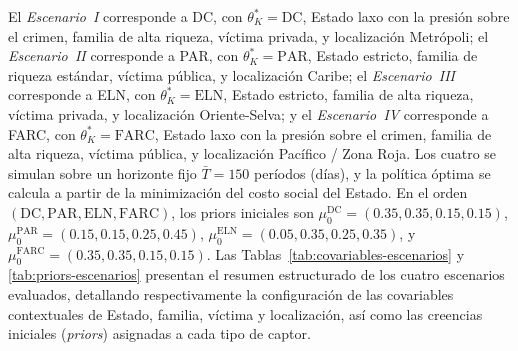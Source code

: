 \documentclass[review,authoryear,12pt]{elsarticle}
\theoremstyle{plain}
\theoremstyle{definition}
\newcommand{\1}{\mathbf{1}}
\begin{document}
El \emph{Escenario~I} corresponde a DC, con $\theta_K^\ast=\mathrm{DC}$, Estado laxo con la presión sobre el crimen, familia de alta riqueza, víctima privada, y localización Metrópoli; el \emph{Escenario~II} corresponde a PAR, con $\theta_K^\ast=\mathrm{PAR}$, Estado estricto, familia de riqueza estándar, víctima pública, y localización Caribe; el \emph{Escenario~III} corresponde a ELN, con $\theta_K^\ast=\mathrm{ELN}$, Estado estricto, familia de alta riqueza, víctima privada, y localización Oriente-Selva; y el \emph{Escenario~IV} corresponde a FARC, con $\theta_K^\ast=\mathrm{FARC}$, Estado laxo con la presión sobre el crimen, familia de alta riqueza, víctima pública, y localización Pacífico / Zona Roja. Los cuatro se simulan sobre un horizonte fijo $\bar{T}=150$ períodos (días), y la política óptima se calcula a partir de la minimización del costo social del Estado. En el orden $(\mathrm{DC},\mathrm{PAR},\mathrm{ELN},\mathrm{FARC})$, los priors iniciales son $\mu_0^{\mathrm{DC}}=(0.35,0.35,0.15,0.15)$, $\mu_0^{\mathrm{PAR}}=(0.15,0.15,0.25,0.45)$, $\mu_0^{\mathrm{ELN}}=(0.05,0.35,0.25,0.35)$, y $\mu_0^{\mathrm{FARC}}=(0.35,0.35,0.15,0.15)$. Las Tablas~\ref{tab:covariables-escenarios} y \ref{tab:priors-escenarios} presentan el resumen estructurado de los cuatro escenarios evaluados, detallando respectivamente la configuración de las covariables contextuales de Estado, familia, víctima y localización, así como las creencias iniciales (\emph{priors}) asignadas a cada tipo de captor.
\end{document}
